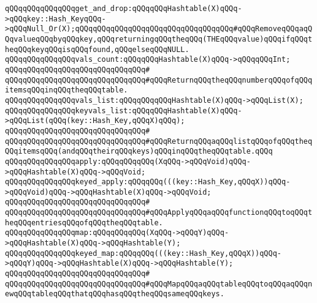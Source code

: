 \verb|qQQqqQQqqQQqqQQqget_and_drop:qQQqqQQqHashtable(X)qQQq->qQQqkey::Hash_KeyqQQq->qQQqNull_Or(X);qQQqqQQqqQQqqQQqqQQqqQQqqQQqqQQqqQQq#qQQqRemoveqQQqaqQQqvalueqQQqbyqQQqkey,qQQqreturningqQQqtheqQQq(THEqQQqvalue)qQQqifqQQqtheqQQqkeyqQQqisqQQqfound,qQQqelseqQQqNULL.|\newline
\newline
\verb|qQQqqQQqqQQqqQQqvals_count:qQQqqQQqHashtable(X)qQQq->qQQqqQQqInt;|\newline
\verb|qQQqqQQqqQQqqQQqqQQqqQQqqQQqqQQq#|\newline
\verb|qQQqqQQqqQQqqQQqqQQqqQQqqQQqqQQq#qQQqReturnqQQqtheqQQqnumberqQQqofqQQqitemsqQQqinqQQqtheqQQqtable.|\newline
\newline
\verb|qQQqqQQqqQQqqQQqvals_list:qQQqqQQqqQQqHashtable(X)qQQq->qQQqList(X);|\newline
\verb|qQQqqQQqqQQqqQQqkeyvals_list:qQQqqQQqHashtable(X)qQQq->qQQqList(qQQq(key::Hash_Key,qQQqX)qQQq);|\newline
\verb|qQQqqQQqqQQqqQQqqQQqqQQqqQQqqQQq#|\newline
\verb|qQQqqQQqqQQqqQQqqQQqqQQqqQQqqQQq#qQQqReturnqQQqaqQQqlistqQQqofqQQqtheqQQqitemsqQQq(andqQQqtheirqQQqkeys)qQQqinqQQqtheqQQqtable.qQQq|\newline
\newline
\verb|qQQqqQQqqQQqqQQqapply:qQQqqQQqqQQq(XqQQq->qQQqVoid)qQQq->qQQqHashtable(X)qQQq->qQQqVoid;|\newline
\verb|qQQqqQQqqQQqqQQqkeyed_apply:qQQqqQQq(((key::Hash_Key,qQQqX))qQQq->qQQqVoid)qQQq->qQQqHashtable(X)qQQq->qQQqVoid;|\newline
\verb|qQQqqQQqqQQqqQQqqQQqqQQqqQQqqQQq#|\newline
\verb|qQQqqQQqqQQqqQQqqQQqqQQqqQQqqQQq#qQQqApplyqQQqaqQQqfunctionqQQqtoqQQqtheqQQqentriesqQQqofqQQqtheqQQqtable.|\newline
\newline
\verb|qQQqqQQqqQQqqQQqmap:qQQqqQQqqQQq(XqQQq->qQQqY)qQQq->qQQqHashtable(X)qQQq->qQQqHashtable(Y);|\newline
\verb|qQQqqQQqqQQqqQQqkeyed_map:qQQqqQQq(((key::Hash_Key,qQQqX))qQQq->qQQqY)qQQq->qQQqHashtable(X)qQQq->qQQqHashtable(Y);|\newline
\verb|qQQqqQQqqQQqqQQqqQQqqQQqqQQqqQQq#|\newline
\verb|qQQqqQQqqQQqqQQqqQQqqQQqqQQqqQQq#qQQqMapqQQqaqQQqtableqQQqtoqQQqaqQQqnewqQQqtableqQQqthatqQQqhasqQQqtheqQQqsameqQQqkeys.|\newline
\newline
